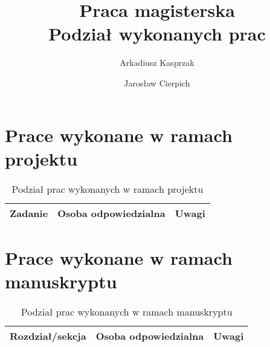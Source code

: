 \documentclass[12pt] {article}
\title {
    \large Praca magisterska \\ Podział wykonanych prac }
\author {Arkadiusz Kasprzak \and Jarosław Cierpich}
\date{}
\begin{document}
\maketitle

\tableofcontents

\newpage

\section {Prace wykonane w ramach projektu}

\begin{table*}[htbp]
\centering
\caption{Podział prac wykonanych w ramach projektu}
\begin{tabularx}{\textwidth}{@{}XXX@{}}
\toprule
Zadanie & 
Osoba odpowiedzialna & 
Uwagi \\ 

\midrule

\bottomrule
\end{tabularx}
\end{table*}


\newpage

\section {Prace wykonane w ramach manuskryptu}

\begin{table*}[htbp]
\centering
\caption{Podział prac wykonanych w ramach manuskryptu}
\begin{tabularx}{\textwidth}{@{}XXX@{}}
\toprule
Rozdział/sekcja & 
Osoba odpowiedzialna & 
Uwagi \\ 

\midrule


\bottomrule
\end{tabularx}
\end{table*}
\end{document}
